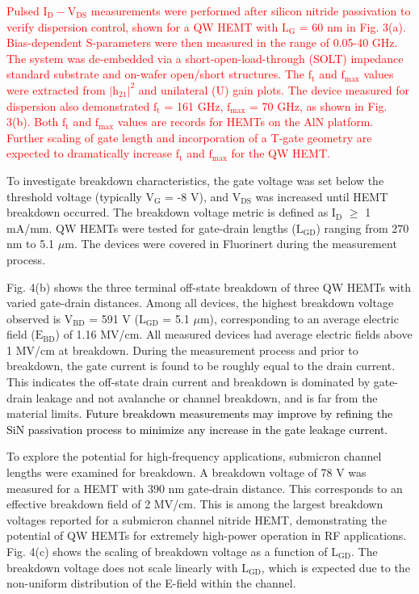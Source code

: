 \documentclass[journal]{IEEEtran}
\begin{document}
\textcolor{red}{Pulsed $\mathrm{I_D-V_{DS}}$ measurements were performed after silicon nitride passivation to verify dispersion control, shown for a QW HEMT with $\mathrm{L_G}$ = 60 nm in Fig. 3(a). Bias-dependent S-parameters were then measured in the range of 0.05-40 GHz. The system was de-embedded via a short-open-load-through (SOLT) impedance standard substrate and on-wafer open/short structures. The $\mathrm{f_t}$ and $\mathrm{f_{max}}$ values were extracted from $\mathrm{\vert h_{21}\vert^2}$ and unilateral (U) gain plots. The device measured for dispersion also demonstrated $\mathrm{f_t}$ = 161 GHz, $\mathrm{f_{max}}$ = 70 GHz, as shown in Fig. 3(b). Both $\mathrm{f_t}$ and $\mathrm{f_{max}}$ values are records for HEMTs on the AlN platform. Further scaling of gate length and incorporation of a T-gate geometry are expected to dramatically increase $\mathrm{f_t}$ and $\mathrm{f_{max}}$ for the QW HEMT.}

To investigate breakdown characteristics, the gate voltage was set below the threshold voltage (typically $\mathrm{V_G}$ = -8 V), and $\mathrm{V_{DS}}$ was increased until HEMT breakdown occurred. The breakdown voltage metric is defined as $\mathrm{I_D}$ $\geq$ 1 mA/mm. QW HEMTs were tested for gate-drain lengths ($\mathrm{L_{GD}}$) ranging from 270 nm to 5.1 $\mu$m. The devices were covered in Fluorinert during the measurement process.

Fig. 4(b) shows the three terminal off-state breakdown of three QW HEMTs with varied gate-drain distances. Among all devices, the highest breakdown voltage observed is $\mathrm{V_{BD}}$ = 591 V ($\mathrm{L_{GD}}$ = 5.1 $\mu$m), corresponding to an average electric field ($\mathrm{E_{BD}}$) of 1.16 MV/cm. All measured devices had average electric fields above 1 MV/cm at breakdown. During the measurement process and prior to breakdown, the gate current is found to be roughly equal to the drain current. This indicates the off-state drain current and breakdown is dominated by gate-drain leakage and not avalanche or channel breakdown, and is far from the material limits. 
\textcolor{black}{Future breakdown measurements may improve by refining the SiN passivation process to minimize any increase in the gate leakage current.}



To explore the potential for high-frequency applications, submicron channel lengths were examined for breakdown. A breakdown voltage of 78 V was measured for a HEMT with 390 nm gate-drain distance. This corresponds to an effective breakdown field of 2 MV/cm. This is among the largest breakdown voltages reported for a submicron channel nitride HEMT, demonstrating the potential of QW HEMTs for extremely high-power operation in RF applications. Fig. 4(c) shows the scaling of breakdown voltage as a function of $\mathrm{L_{GD}}$. The breakdown voltage does not scale linearly with $\mathrm{L_{GD}}$, which is expected due to the non-uniform distribution of the E-field within the channel.
\end{document}
